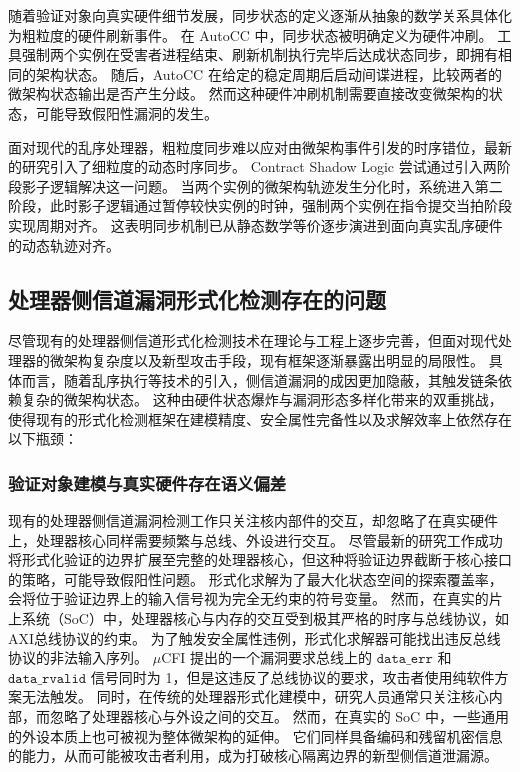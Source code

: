随着验证对象向真实硬件细节发展，同步状态的定义逐渐从抽象的数学关系具体化为粗粒度的硬件刷新事件。
在 AutoCC\cite{10.1145/3613424.3614254} 中，同步状态被明确定义为硬件冲刷。
工具强制两个实例在受害者进程结束、刷新机制执行完毕后达成状态同步，即拥有相同的架构状态。
随后，AutoCC 在给定的稳定周期后启动间谍进程，比较两者的微架构状态输出是否产生分歧。
然而这种硬件冲刷机制需要直接改变微架构的状态，可能导致假阳性漏洞的发生。

面对现代的乱序处理器，粗粒度同步难以应对由微架构事件引发的时序错位，最新的研究引入了细粒度的动态时序同步。
Contract Shadow Logic\cite{10.1145/3669940.3707243} 尝试通过引入两阶段影子逻辑解决这一问题。
当两个实例的微架构轨迹发生分化时，系统进入第二阶段，此时影子逻辑通过暂停较快实例的时钟，强制两个实例在指令提交当拍阶段实现周期对齐。
这表明同步机制已从静态数学等价逐步演进到面向真实乱序硬件的动态轨迹对齐。

\subsection{处理器侧信道漏洞形式化检测存在的问题}
尽管现有的处理器侧信道形式化检测技术在理论与工程上逐步完善，但面对现代处理器的微架构复杂度以及新型攻击手段，现有框架逐渐暴露出明显的局限性。
具体而言，随着乱序执行等技术的引入，侧信道漏洞的成因更加隐蔽，其触发链条依赖复杂的微架构状态。
这种由硬件状态爆炸与漏洞形态多样化带来的双重挑战，使得现有的形式化检测框架在建模精度、安全属性完备性以及求解效率上依然存在以下瓶颈：


\subsubsection{验证对象建模与真实硬件存在语义偏差}
现有的处理器侧信道漏洞检测工作只关注核内部件的交互，却忽略了在真实硬件上，处理器核心同样需要频繁与总线、外设进行交互。
尽管最新的研究工作\cite{10.1145/3669940.3707243}\cite{10.1145/3658644.3690344}成功将形式化验证的边界扩展至完整的处理器核心，但这种将验证边界截断于核心接口的策略，可能导致假阳性问题。
形式化求解为了最大化状态空间的探索覆盖率，会将位于验证边界上的输入信号视为完全无约束的符号变量。
然而，在真实的片上系统（SoC）中，处理器核心与内存的交互受到极其严格的时序与总线协议，如AXI总线协议的约束。
为了触发安全属性违例，形式化求解器可能找出违反总线协议的非法输入序列。
$\mu$CFI\cite{10.1145/3658644.3690344} 提出的一个漏洞要求总线上的 $\texttt{data\_err}$ 和 $\texttt{data\_rvalid}$ 信号同时为 1，但是这违反了总线协议的要求，攻击者使用纯软件方案无法触发。
同时，在传统的处理器形式化建模中，研究人员通常只关注核心内部，而忽略了处理器核心与外设之间的交互。
然而，在真实的 SoC 中，一些通用的外设本质上也可被视为整体微架构的延伸。
它们同样具备编码和残留机密信息的能力，从而可能被攻击者利用，成为打破核心隔离边界的新型侧信道泄漏源。

